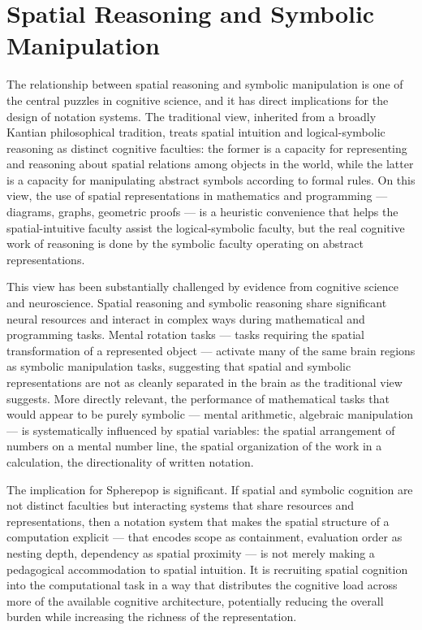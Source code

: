 \documentclass[12pt,openany]{book}
\theoremstyle{plain}
\theoremstyle{definition}
\theoremstyle{remark}
\begin{document}
\section{Spatial Reasoning and Symbolic Manipulation}

The relationship between spatial reasoning and symbolic manipulation is one of the central puzzles in cognitive science, and it has direct implications for the design of notation systems. The traditional view, inherited from a broadly Kantian philosophical tradition, treats spatial intuition and logical-symbolic reasoning as distinct cognitive faculties: the former is a capacity for representing and reasoning about spatial relations among objects in the world, while the latter is a capacity for manipulating abstract symbols according to formal rules. On this view, the use of spatial representations in mathematics and programming — diagrams, graphs, geometric proofs — is a heuristic convenience that helps the spatial-intuitive faculty assist the logical-symbolic faculty, but the real cognitive work of reasoning is done by the symbolic faculty operating on abstract representations.

This view has been substantially challenged by evidence from cognitive science and neuroscience. Spatial reasoning and symbolic reasoning share significant neural resources and interact in complex ways during mathematical and programming tasks. Mental rotation tasks — tasks requiring the spatial transformation of a represented object — activate many of the same brain regions as symbolic manipulation tasks, suggesting that spatial and symbolic representations are not as cleanly separated in the brain as the traditional view suggests. More directly relevant, the performance of mathematical tasks that would appear to be purely symbolic — mental arithmetic, algebraic manipulation — is systematically influenced by spatial variables: the spatial arrangement of numbers on a mental number line, the spatial organization of the work in a calculation, the directionality of written notation.

The implication for Spherepop is significant. If spatial and symbolic cognition are not distinct faculties but interacting systems that share resources and representations, then a notation system that makes the spatial structure of a computation explicit — that encodes scope as containment, evaluation order as nesting depth, dependency as spatial proximity — is not merely making a pedagogical accommodation to spatial intuition. It is recruiting spatial cognition into the computational task in a way that distributes the cognitive load across more of the available cognitive architecture, potentially reducing the overall burden while increasing the richness of the representation.
\end{document}
